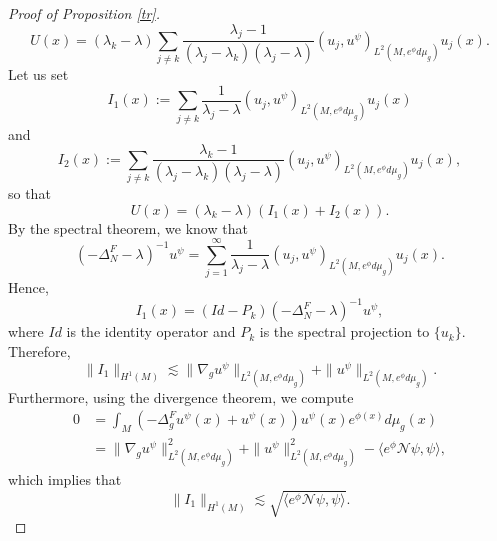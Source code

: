 \documentclass[12pt,a4paper]{amsart}
\numberwithin{equation}{section}
\theoremstyle{plain}
\theoremstyle{definition}
\begin{document}
\begin{proof}[Proof of Proposition \ref{tr}]
\begin{equation*}
        U(x) =  (\lambda_k - \lambda) \sum_{j\neq k} \frac{\lambda_j - 1}{(\lambda_j - \lambda_k)(\lambda_j - \lambda)}(u_j,u^\psi)_{L^2(M,e^\phi d\mu_g)} u_j(x) .
    \end{equation*}
    Let us set
    \begin{equation*}
        I_1(x) := \sum_{j\neq k} \frac{1}{\lambda_j - \lambda}(u_j,u^\psi)_{L^2(M,e^\phi d\mu_g)} u_j(x)
    \end{equation*}
    and
    \begin{equation*}
        I_2(x) := \sum_{j\neq k} \frac{\lambda_k - 1}{(\lambda_j - \lambda_k)(\lambda_j - \lambda)}(u_j,u^\psi)_{L^2(M,e^\phi d\mu_g)} u_j(x),
    \end{equation*}
    so that
    \begin{equation*}
        U(x) = (\lambda_k - \lambda) \left( I_1(x) + I_2(x)\right).
    \end{equation*}
    By the spectral theorem, we know that
    \begin{equation*}
        (-\Delta_N^F - \lambda)^{-1} u^\psi = \sum_{j=1}^\infty \frac{1}{\lambda_j - \lambda}(u_j,u^\psi)_{L^2(M,e^\phi d\mu_g)} u_j(x).
    \end{equation*}
    Hence,
    \begin{equation*}
        I_1(x) = (Id - P_k) (-\Delta_N^F - \lambda)^{-1} u^\psi,
    \end{equation*}
    where $Id$ is the identity operator and $P_k$ is the spectral projection to $\{u_k\}$. Therefore, 
    \begin{equation*}
        \|I_1\|_{H^1(M)} \lesssim \|\nabla_gu^\psi\|_{L^2(M,e^\phi d\mu_g)} + \|u^\psi\|_{L^2(M,e^\phi d\mu_g)}.
    \end{equation*}
    Furthermore, using the divergence theorem, we compute
    \begin{align}\label{ND_map_dua}
        0 &= \int_M (-\Delta_g^F u^\psi(x) + u^\psi(x)) u^\psi(x) e^{\phi(x)} d\mu_g(x) \\
        \nonumber &= \|\nabla_gu^\psi\|_{L^2(M,e^\phi d\mu_g)}^2 + \|u^\psi\|_{L^2(M,e^\phi d\mu_g)}^2 - \langle e^\phi \mathcal{N} \psi,\psi \rangle,
    \end{align}
    which implies that 
    \begin{equation*}
        \|I_1\|_{H^1(M)} \lesssim \sqrt{\langle e^\phi \mathcal{N} \psi,\psi \rangle}.
    \end{equation*}
    

\end{proof}
\end{document}
